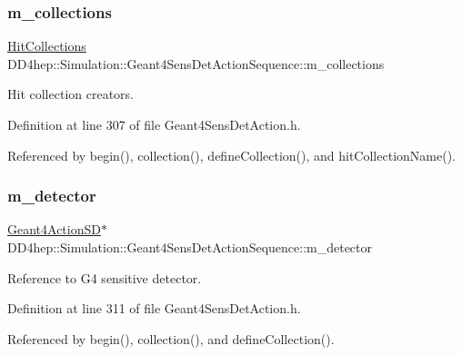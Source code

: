 \subsubsection{\texorpdfstring{m\+\_\+collections}{m\_collections}}
{\footnotesize\ttfamily \hyperlink{class_d_d4hep_1_1_simulation_1_1_geant4_sens_det_action_sequence_aabeb325e4b6af156cbae3578b00301b3}{Hit\+Collections} D\+D4hep\+::\+Simulation\+::\+Geant4\+Sens\+Det\+Action\+Sequence\+::m\+\_\+collections\hspace{0.3cm}{\ttfamily [protected]}}



Hit collection creators. 



Definition at line 307 of file Geant4\+Sens\+Det\+Action.\+h.



Referenced by begin(), collection(), define\+Collection(), and hit\+Collection\+Name().

\hypertarget{class_d_d4hep_1_1_simulation_1_1_geant4_sens_det_action_sequence_a4c35959bba4b7d3f05a8aa48970be68a}{}\label{class_d_d4hep_1_1_simulation_1_1_geant4_sens_det_action_sequence_a4c35959bba4b7d3f05a8aa48970be68a} 
\subsubsection{\texorpdfstring{m\+\_\+detector}{m\_detector}}
{\footnotesize\ttfamily \hyperlink{class_d_d4hep_1_1_simulation_1_1_geant4_action_s_d}{Geant4\+Action\+SD}$\ast$ D\+D4hep\+::\+Simulation\+::\+Geant4\+Sens\+Det\+Action\+Sequence\+::m\+\_\+detector\hspace{0.3cm}{\ttfamily [protected]}}



Reference to G4 sensitive detector. 



Definition at line 311 of file Geant4\+Sens\+Det\+Action.\+h.



Referenced by begin(), collection(), and define\+Collection().

\hypertarget{class_d_d4hep_1_1_simulation_1_1_geant4_sens_det_action_sequence_a15a09899c6ec50b8d14f4543362d9c91}{}\label{class_d_d4hep_1_1_simulation_1_1_geant4_sens_det_action_sequence_a15a09899c6ec50b8d14f4543362d9c91} 
